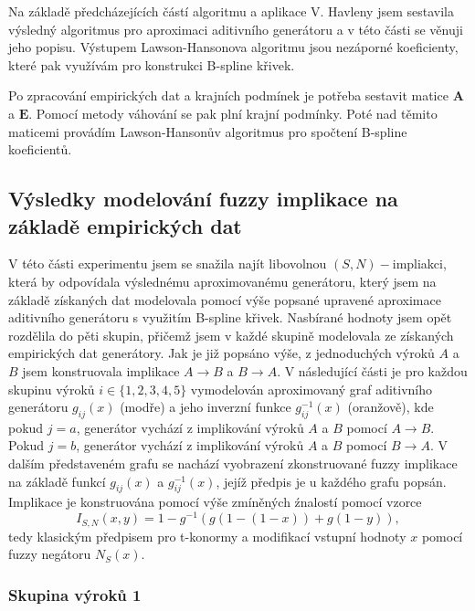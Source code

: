 
Na základě předcházejících částí algoritmu a aplikace V. Havleny jsem sestavila výsledný algoritmus pro aproximaci aditivního generátoru a v této části se věnuji jeho popisu. Výstupem Lawson-Hansonova algoritmu jsou nezáporné koeficienty, které pak využívám pro konstrukci B-spline křivek.

Po zpracování empirických dat a krajních podmínek je potřeba sestavit matice $\mathbf{A}$ a $\mathbf{E}$. Pomocí metody váhování se pak plní krajní podmínky. Poté nad těmito maticemi provádím Lawson-Hanson\r uv algoritmus pro spočtení B-spline koeficient\r u. 


\subsection{Výsledky  modelování fuzzy implikace na základě empirických dat}

V této části experimentu jsem se snažila najít libovolnou $(S,N)-$impliakci, která by odpovídala výslednému aproximovanému generátoru, který jsem na základě získaných dat modelovala pomocí výše popsané upravené aproximace aditivního generátoru s využitím B-spline křivek. Nasbírané hodnoty jsem opět rozdělila do pěti skupin, přičemž jsem v každé skupině modelovala ze získaných empirických dat generátory. Jak je již popsáno výše, z jednoduchých výrok\r u $A$ a $B$ jsem konstruovala implikace $A \to B$ a $B \to A$. V následující části je pro každou skupinu výrok\r u $i \in \{1, 2, 3, 4, 5\}$ vymodelován aproximovaný graf aditivního generátoru $g_{ij}(x)$ (modře) a jeho inverzní funkce $g_{ij}^{-1}(x)$ (oranžově), kde pokud $j = a$, generátor vychází z implikování výrok\r u $A$ a $B$ pomocí $A \to B$. Pokud $j = b$, generátor vychází z implikování výrok\r u $A$ a $B$ pomocí $B \to A$. V dalším představeném grafu se nachází vyobrazení zkonstruované fuzzy implikace na základě funkcí $g_{ij}(x)$ a $g_{ij}^{-1}(x)$, jejíž předpis je u každého grafu popsán. Implikace je konstruována pomocí výše zmíněných \' znalostí pomocí vzorce $$I_{S,N}(x,y) = 1-g^{-1}(g(1-(1-x))+g(1-y)),$$ tedy klasickým předpisem pro t-konormy a modifikací vstupní hodnoty $x$ pomocí fuzzy negátoru $N_S(x).$

\subsubsection{Skupina výrok\r u 1}




